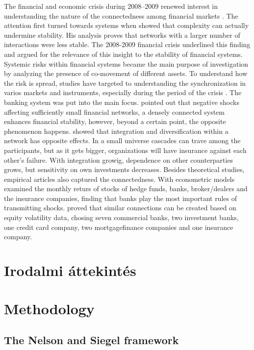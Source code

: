 \documentclass{article}
\begin{document}
The financial and economic crisis during 2008–2009 renewed interest in understanding the nature of the connectedness among financial markets \cite{aloui2011global}. The attention first turned towards systems when \cite{may1972will} showed that complexity can actually undermine stability. His analysis proves that networks with a larger number of interactions were less stable. The 2008-2009 financial crisis underlined this finding and \cite{haldane2011systemic} argued for the relevance of this insight to the stability of financial systems. Systemic risks within financial systems became the main purpose of investigation by analyzing the presence of co-movement of different assets. To understand how the risk is spread, studies have targeted to understanding the synchronization in varios markets and instruments, especially during the period of the crisis \cite{bisias2012survey}. The banking system was put into the main focus. \cite{acemoglu2015systemic} pointed out that negative shocks affecting sufficiently small financial networks, a densely connected system enhances financial stability, however, beyond a certain point, the opposite phenomenon happens.  \cite{elliott2014financial} showed that integration and diversification within a network has opposite effects. In a small universe cascades can trave among the participants, but as it gets bigger, organizations will have insurance against each other’s failure. With integration growig, dependence on other counterparties grows, but sensitivity on own investments decreases. Besides theoretical studies, empirical articles also captured the connectedness. With econometric models \cite{billio2012econometric} examined the monthly returs of stocks of hedge funds, banks, broker/dealers and the insurance companies, finding that banks play the most important rules of transmitting shocks. \cite{diebold2014network} proved that similar connections can be created based on equity volatility data, chosing seven commercial banks, two investment banks, one credit card company, two mortgagefinance companies and one insurance company.

\section{Irodalmi áttekintés}

\section{Methodology}
\noindent
\subsection{The Nelson and Siegel framework}
\end{document}

